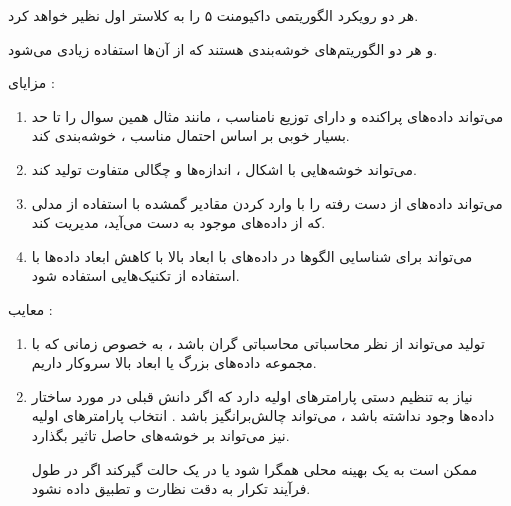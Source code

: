 \begin{boxM}
    هر دو رویکرد الگوریتمی داکیومنت ۵ را به کلاستر اول نظیر خواهد کرد.
\end{boxM}


\begin{boxM}
        و
        هر دو الگوریتم‌های خوشه‌بندی هستند که از آن‌ها استفاده زیادی می‌شود.

        مزایای 
         : 

        \begin{enumerate}
            \item 
            می‌تواند داده‌های پراکنده و دارای توزیع نامناسب ، مانند مثال همین سوال را تا حد بسیار خوبی بر اساس احتمال 
            مناسب ، خوشه‌بندی کند.

            \item 
            می‌تواند خوشه‌هایی با اشکال ، اندازه‌ها و چگالی متفاوت تولید کند.

            \item 
            می‌تواند داده‌های از دست رفته را با وارد کردن مقادیر گمشده با استفاده از مدلی که از داده‌های موجود به دست می‌آید، مدیریت کند.

            \item
            می‌تواند برای شناسایی الگوها در داده‌های با ابعاد بالا با کاهش ابعاد داده‌ها با استفاده از تکنیک‌هایی استفاده شود.
            
            
            
        \end{enumerate}

        معایب 
        :
        \begin{enumerate}
            \item 
            تولید 
            می‌تواند از نظر محاسباتی محاسباتی گران باشد ، به خصوص زمانی که با مجموعه داده‌های بزرگ یا ابعاد بالا سروکار داریم.

            \item 
            نیاز به تنظیم دستی پارامترهای اولیه دارد که اگر دانش قبلی در مورد ساختار داده‌ها وجود نداشته باشد ، می‌تواند چالش‌برانگیز باشد . انتخاب پارامترهای اولیه نیز می‌تواند بر خوشه‌های حاصل تاثیر بگذارد.
            
            ممکن است به یک بهینه محلی همگرا شود یا در یک حالت گیرکند اگر در طول فرآیند تکرار به دقت نظارت و تطبیق داده نشود.


\end{enumerate}
\end{boxM}
